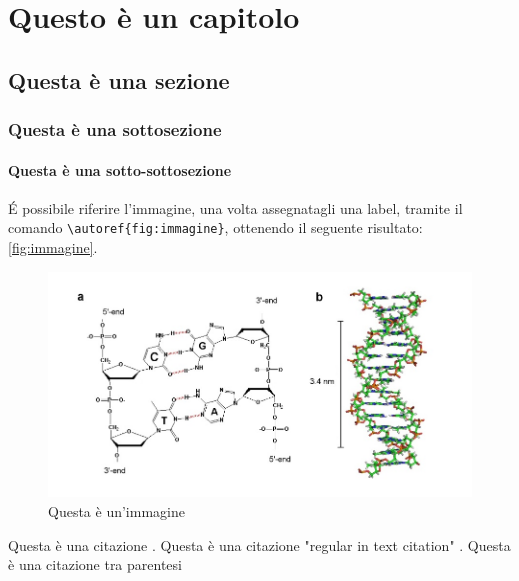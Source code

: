 \chapter{Questo è un capitolo}

\lipsum[1]

\section{Questa è una sezione}

\lipsum[2]

\subsection{Questa è una sottosezione}

\lipsum[3]

\subsubsection{Questa è una sotto-sottosezione}

\lipsum[4]

É possibile riferire l'immagine, una volta assegnatagli una label, tramite il comando \texttt{\textbackslash autoref\{fig:immagine\}}, ottenendo il seguente risultato: \autoref{fig:immagine}.

\begin{figure}
    \centering
    \includegraphics[width= \textwidth]{images/Capitolo1/immagine.jpg} %
    \caption{Questa è un'immagine} 
    \label{fig:immagine} %
\end{figure}

Questa è una citazione \cite{warstadt2020blimp}.
Questa è una citazione "regular in text citation" \citet{warstadt2020blimp}.  %
Questa è una citazione tra parentesi \citep{warstadt2020blimp}

